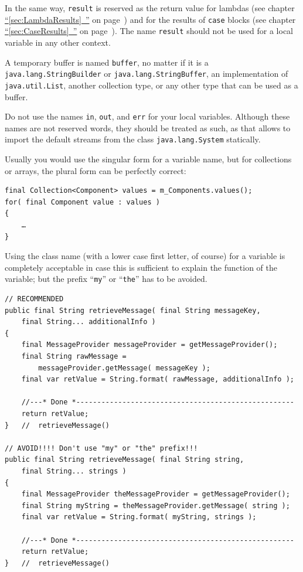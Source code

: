\documentclass[11pt,a4paper, titlepage, parskip=half, headsepline, footsepline, cleardoublepage=current, headheight=1cm]{scrbook}
\newcommand*{\tqfullvref}[1]{\hyperref[{#1}]{“\ref*{#1}~\nameref*{#1}”} on page~\pageref{#1}}
\begin{document}
In the same way, \lstinline|result| is reserved as the return value for lambdas (see chapter \tqfullvref{sec:LambdaResults}) and for the results of \lstinline|case| blocks (see chapter \tqfullvref{sec:CaseResults}). The name \lstinline|result| should not be used for a local variable in any other context.

A temporary buffer is named \lstinline|buffer|, no matter if it is a \lstinline|java.lang.StringBuilder| or \lstinline|java.lang.StringBuffer|, an implementation of \lstinline|java.util.List|, another collection type, or any other type that can be used as a buffer.

Do not use the names \lstinline|in|, \lstinline|out|, and \lstinline|err| for your local variables. Although these names are not reserved words, they should be treated as such, as that allows to import the default streams from the class \lstinline|java.lang.System|\autocite{ORACLE_DOC_SYSTEM_CLASS} statically.

Usually you would use the singular form for a variable name, but for collections or arrays, the plural form can be perfectly correct:
\begin{lstlisting}
final Collection<Component> values = m_Components.values();
for( final Component value : values )
{
    …
}    
\end{lstlisting}

Using the class name (with a lower case first letter, of course) for a variable is completely acceptable in case this is sufficient to explain the function of the variable; but the prefix “\verb#my#” or “\verb#the#” has to be avoided.
\begin{lstlisting}
// RECOMMENDED
public final String retrieveMessage( final String messageKey, 
    final String... additionalInfo )
{
    final MessageProvider messageProvider = getMessageProvider();
    final String rawMessage = 
        messageProvider.getMessage( messageKey );
    final var retValue = String.format( rawMessage, additionalInfo );
    
    //---* Done *----------------------------------------------------
    return retValue;
}   //  retrieveMessage()

// AVOID!!!! Don't use "my" or "the" prefix!!!
public final String retrieveMessage( final String string, 
    final String... strings )
{
    final MessageProvider theMessageProvider = getMessageProvider();
    final String myString = theMessageProvider.getMessage( string );
    final var retValue = String.format( myString, strings );
    
    //---* Done *----------------------------------------------------
    return retValue;
}   //  retrieveMessage()
\end{lstlisting}
\end{document}
